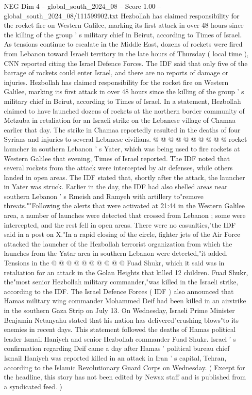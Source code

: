 \begin{textsample}{NEG Dim 4 – global\_south\_2024\_08 – Score 1.00 – global\_south\_2024\_08/111599902.txt}  \label{ex:f4_neg_334}
Hezbollah has claimed responsibility for the rocket fire on Western Galilee, marking its first attack in over 48 hours since the killing of the group ' s military chief in Beirut, according to Times of Israel.
As tensions continue to escalate in the Middle East, dozens of rockets were fired from Lebanon toward Israeli territory in the late hours of Thursday ( local time ), CNN reported citing the Israel Defence Forces.
The IDF said that only five of the barrage of rockets could enter Israel, and there are no reports of damage or injuries.
Hezbollah has claimed responsibility for the rocket fire on Western Galilee, marking its first attack in over 48 hours since the killing of the group ' s military chief in Beirut, according to Times of Israel.
In a statement, Hezbollah claimed to have launched dozens of rockets at the northern border community of Metzuba in retaliation for an Israeli strike on the Lebanese village of Chamaa earlier that day.
The strike in Chamaa reportedly resulted in the deaths of four Syrians and injuries to several Lebanese civilians. @ @ @ @ @ @ @ @ @ @ rocket launcher in southern Lebanon ' s Yater, which was being used to fire rockets at Western Galilee that evening, Times of Israel reported.
The IDF noted that several rockets from the attack were intercepted by air defenses, while others landed in open areas.
The IDF stated that, shortly after the attack, the launcher in Yater was struck.
Earlier in the day, the IDF had also shelled areas near southern Lebanon ' s Rmeish and Ramyeh with artillery to"remove threats.""Following the alerts that were activated at 21:44 in the Western Galilee area, a number of launches were detected that crossed from Lebanon ; some were intercepted, and the rest fell in open areas.
There were no casualties,"the IDF said in a post on X."In a rapid closing of the circle, fighter jets of the Air Force attacked the launcher of the Hezbollah terrorist organization from which the launches from the Yatar area in southern Lebanon were detected,"it added.
Tensions in the @ @ @ @ @ @ @ @ @ @ Fuad Shukr, which it said was in retaliation for an attack in the Golan Heights that killed 12 children.
Fuad Shukr, the"most senior Hezbollah military commander,"was killed in the Israeli strike, according to the IDF.
The Israel Defence Forces ( IDF ) also announced that Hamas military wing commander Mohammed Deif had been killed in an airstrike in the southern Gaza Strip on July 13.
On Wednesday, Israeli Prime Minister Benjamin Netanyahu stated that his nation has delivered"crushing blows"to its enemies in recent days.
This statement followed the deaths of Hamas political leader Ismail Haniyeh and senior Hezbollah commander Fuad Shukr.
Israel ' s confirmation regarding Deif came a day after Hamas ' political bureau chief Ismail Haniyeh was reported killed in an attack in Iran ' s capital, Tehran, according to the Islamic Revolutionary Guard Corps on Wednesday. ( Except for the headline, this story has not been edited by Newsx staff and is published from a syndicated feed. )

\end{textsample}
